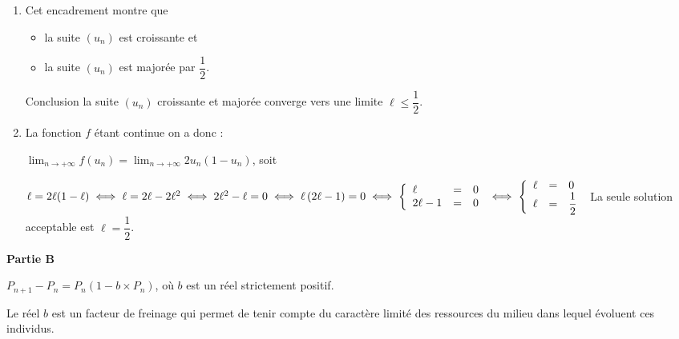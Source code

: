 \documentclass[10pt]{article}
\begin{document}
\begin{enumerate}
\begin{itemize}
pour tout rentier naturel $n,\: u_n \leqslant u_{n+1} \leqslant \dfrac12$
\end{itemize}

\item 
Cet encadrement montre que 
\begin{itemize}
\item la suite $\left(u_n\right)$ est croissante et
\item la suite $\left(u_n\right)$ est majorée par $\dfrac12$.
\end{itemize}

Conclusion la suite $\left(u_n\right)$ croissante et majorée converge vers une limite $\ell \leqslant \dfrac12$.

\item 
La fonction $f$ étant continue on a donc :

$\displaystyle\lim_{n \to + \infty} f\left(u_n\right) = \displaystyle\lim_{n \to + \infty} 2u_n\left(1 - u_n\right)$, soit 

$\ell = 2\ell(1 - \ell) \iff \ell = 2\ell - 2\ell^2 \iff 2\ell^2 - \ell = 0 \iff \ell\left(2\ell - 1\right) = 0 \iff \left\{\begin{array}{l c l}
\ell&=&0\\
2\ell - 1&=&0
\end{array}\right. \iff \left\{\begin{array}{l c l}
\ell&=&0\\
\ell &=&\dfrac12
\end{array}\right.$ La seule solution acceptable est $\ell = \dfrac12$.
\end{enumerate}

\bigskip

\textbf{Partie B}

\medskip











\begin{center}$P_{n+1} -  P_n = P_n\left(1 -  b \times P_n\right)$, où $b$ est un réel strictement positif.\end{center}

Le réel $b$ est un facteur de freinage qui permet de tenir compte du caractère limité des
ressources du milieu dans lequel évoluent ces individus.

\medskip
\end{document}
